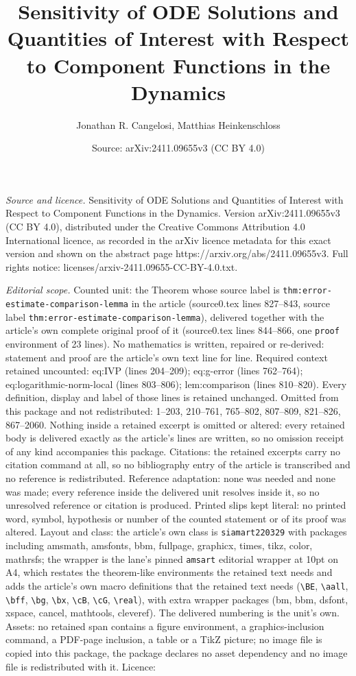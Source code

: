 \documentclass[10pt,a4paper]{amsart}
\title[Sensitivity of ODE Solutions and Quantities of Interest with]{Sensitivity of ODE Solutions and Quantities of Interest with Respect to Component Functions in the Dynamics}
\author{Jonathan R. Cangelosi, Matthias Heinkenschloss}
\date{Source: arXiv:2411.09655v3 (CC BY 4.0)}
\begin{document}
\maketitle

\noindent\emph{Source and licence.} Sensitivity of ODE Solutions and Quantities of Interest with Respect to Component Functions in the Dynamics. Version arXiv:2411.09655v3 (CC BY 4.0), distributed under the Creative Commons Attribution 4.0 International licence, as recorded in the arXiv licence metadata for this exact version and shown on the abstract page https://arxiv.org/abs/2411.09655v3. Full rights notice: licenses/arxiv-2411.09655-CC-BY-4.0.txt.\par\smallskip

\noindent\textit{Editorial scope.} Counted unit: the Theorem whose source label is \texttt{thm:error-estimate-comparison-lemma} in the article (source0.tex lines 827--843, source label \texttt{thm:error-estimate-comparison-lemma}), delivered together with the article's own complete original proof of it (source0.tex lines 844--866, one \texttt{proof} environment of 23 lines). No mathematics is written, repaired or re-derived: statement and proof are the article's own text line for line. Required context retained uncounted: eq:IVP (lines 204--209); eq:g-error (lines 762--764); eq:logarithmic-norm-local (lines 803--806); lem:comparison (lines 810--820). Every definition, display and label of those lines is retained unchanged. Omitted from this package and not redistributed: 1--203, 210--761, 765--802, 807--809, 821--826, 867--2060. Nothing inside a retained excerpt is omitted or altered: every retained body is delivered exactly as the article's lines are written, so no omission receipt of any kind accompanies this package. Citations: the retained excerpts carry no citation command at all, so no bibliography entry of the article is transcribed and no reference is redistributed. Reference adaptation: none was needed and none was made; every reference inside the delivered unit resolves inside it, so no unresolved reference or citation is produced. Printed slips kept literal: no printed word, symbol, hypothesis or number of the counted statement or of its proof was altered. Layout and class: the article's own class is \texttt{siamart220329} with packages including amsmath, amsfonts, bbm, fullpage, graphicx, times, tikz, color, mathrsfs; the wrapper is the lane's pinned \texttt{amsart} editorial wrapper at 10pt on A4, which restates the theorem-like environments the retained text needs and adds the article's own macro definitions that the retained text needs (\texttt{\textbackslash BE}, \texttt{\textbackslash aall}, \texttt{\textbackslash bff}, \texttt{\textbackslash bg}, \texttt{\textbackslash bx}, \texttt{\textbackslash cB}, \texttt{\textbackslash cG}, \texttt{\textbackslash real}), with extra wrapper packages (bm, bbm, dsfont, xspace, cancel, mathtools, cleveref). The delivered numbering is the unit's own. Assets: no retained span contains a figure environment, a graphics-inclusion command, a PDF-page inclusion, a table or a TikZ picture; no image file is copied into this package, the package declares no asset dependency and no image file is redistributed with it. Licence: 
\end{document}
